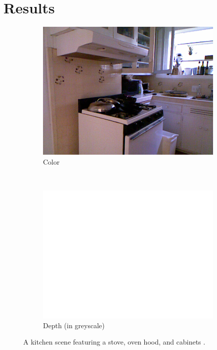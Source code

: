 
\section{Results}
\label{sec:results}

\begin{figure}
    \centering
    \begin{subfigure}[t]{0.5\textwidth}
        \centering
        \includegraphics[height=.7\textwidth]{figs/Original321.png}
        \caption{Color}
        \label{fig:original:color}
    \end{subfigure}%
    ~ 
    \begin{subfigure}[t]{0.5\textwidth}
        \centering
        \includegraphics[height=.7\textwidth]{figs/Depth321.png}
        \caption{Depth (in greyscale)}
        \label{fig:original:depth}
    \end{subfigure}
    \caption{A kitchen scene featuring a stove, oven hood, and cabinets \cite{kinect}.}
    \label{fig:original}
\end{figure}

